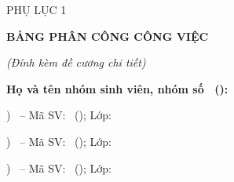 \cleardoublepage
{}
{}

\begin{flushright}
{\fontsize{12}{15}\selectfont PHỤ LỤC 1}
\end{flushright}
\vspace{-2mm}
\begin{center}
{\bfseries\fontsize{14}{18}\selectfont BẢNG PHÂN CÔNG CÔNG VIỆC\par}
{\textit{\fontsize{12.5}{16}\selectfont (Đính kèm đề cương chi tiết)}\par}
\end{center}
\vspace{2mm}

{\fontsize{12}{15}\selectfont
\noindent\textbf{Họ và tên nhóm sinh viên, nhóm số \SoNhom\ (\TenNhom):}\par
{}) \TenSinhVien\ -- Mã SV: \MaSinhVien\ (\VaiTroSinhVienMot); Lớp: \LopSinhVien\par
{}) \TenSinhVienHai\ -- Mã SV: \MaSinhVienHai\ (\VaiTroSinhVienHai); Lớp: \LopSinhVien\par
{}) \TenSinhVienBa\ -- Mã SV: \MaSinhVienBa\ (\VaiTroSinhVienBa); Lớp: \LopSinhVien\par
}
\vspace{3mm}

